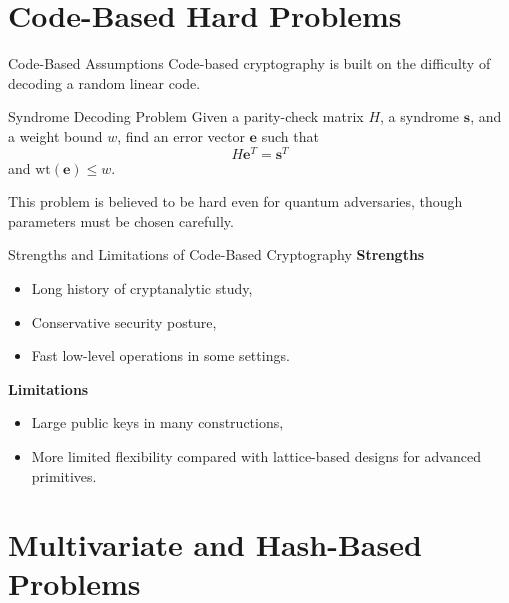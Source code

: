 \documentclass[aspectratio=169]{beamer}
\begin{document}
	\section{Code-Based Hard Problems}
	
	\begin{frame}{Code-Based Assumptions}
		Code-based cryptography is built on the difficulty of decoding a random linear code.
		
		\begin{block}{Syndrome Decoding Problem}
			Given a parity-check matrix $H$, a syndrome $\bm{s}$, and a weight bound $w$, find an error vector $\bm{e}$ such that
			\[
			H \bm{e}^T = \bm{s}^T
			\]
			and $\mathrm{wt}(\bm{e}) \leq w$.
		\end{block}
		
		\vspace{0.5em}
		This problem is believed to be hard even for quantum adversaries, though parameters must be chosen carefully.
	\end{frame}
	
	\begin{frame}{Strengths and Limitations of Code-Based Cryptography}
		\textbf{Strengths}
		\begin{itemize}
			\item Long history of cryptanalytic study,
			\item Conservative security posture,
			\item Fast low-level operations in some settings.
		\end{itemize}
		
		\vspace{0.5em}
		\textbf{Limitations}
		\begin{itemize}
			\item Large public keys in many constructions,
			\item More limited flexibility compared with lattice-based designs for advanced primitives.
		\end{itemize}
	\end{frame}
	
	\section{Multivariate and Hash-Based Problems}
	
\end{document}
